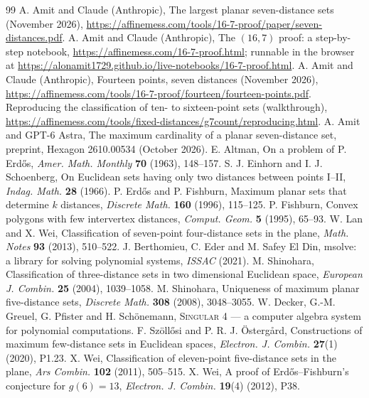 \documentclass[11pt]{amsart}
\theoremstyle{remark}
\begin{document}
\begin{thebibliography}{99}
 A. Amit and Claude (Anthropic), The largest planar seven-distance sets (November 2026),
  \url{https://affinemess.com/tools/16-7-proof/paper/seven-distances.pdf}.
 A. Amit and Claude (Anthropic), The $(16,7)$ proof: a step-by-step notebook,
  \url{https://affinemess.com/16-7-proof.html}; runnable in the browser at
  \url{https://alonamit1729.github.io/live-notebooks/16-7-proof.html}.
 A. Amit and Claude (Anthropic), Fourteen points, seven distances (November 2026),
  \url{https://affinemess.com/tools/16-7-proof/fourteen/fourteen-points.pdf}.
 Reproducing the classification of ten- to sixteen-point sets (walkthrough),
  \url{https://affinemess.com/tools/fixed-distances/g7count/reproducing.html}.
 A. Amit and GPT-6 Astra, The maximum cardinality of a planar seven-distance set, preprint,
  Hexagon 2610.00534 (October 2026).
 E. Altman, On a problem of P. Erdős, \emph{Amer. Math. Monthly} \textbf{70} (1963), 148--157.
 S. J. Einhorn and I. J. Schoenberg, On Euclidean sets having only two distances between points
  I--II, \emph{Indag. Math.} \textbf{28} (1966).
 P. Erdős and P. Fishburn, Maximum planar sets that determine $k$ distances, \emph{Discrete
  Math.} \textbf{160} (1996), 115--125.
 P. Fishburn, Convex polygons with few intervertex distances, \emph{Comput. Geom.} \textbf{5}
  (1995), 65--93.
 W. Lan and X. Wei, Classification of seven-point four-distance sets in the plane, \emph{Math.
  Notes} \textbf{93} (2013), 510--522.
 J. Berthomieu, C. Eder and M. Safey El Din, msolve: a library for solving polynomial
  systems, \emph{ISSAC} (2021).
 M. Shinohara, Classification of three-distance sets in two dimensional Euclidean space,
  \emph{European J. Combin.} \textbf{25} (2004), 1039--1058.
 M. Shinohara, Uniqueness of maximum planar five-distance sets, \emph{Discrete Math.}
  \textbf{308} (2008), 3048--3055.
 W. Decker, G.-M. Greuel, G. Pfister and H. Schönemann, \textsc{Singular} 4 --- a computer
  algebra system for polynomial computations.
 F. Szöllősi and P. R. J. Östergård, Constructions of maximum few-distance sets in Euclidean
  spaces, \emph{Electron. J. Combin.} \textbf{27}(1) (2020), P1.23.
 X. Wei, Classification of eleven-point five-distance sets in the plane, \emph{Ars Combin.}
  \textbf{102} (2011), 505--515.
 X. Wei, A proof of Erdős--Fishburn's conjecture for $g(6)=13$, \emph{Electron. J. Combin.}
  \textbf{19}(4) (2012), P38.
\end{thebibliography}
\end{document}
